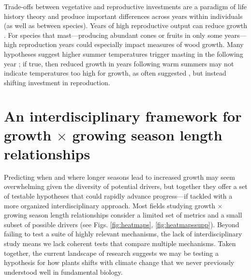\documentclass[11pt]{article}
\begin{document}
Trade-offs between vegetative and reproductive investments are a paradigm of life history theory and produce important differences across years within individuals (as well as between species). Years of high reproductive output can reduce growth \citep{thomas2011bookchptr,hacket2016tree}. For species that mast---producing abundant cones or fruits in only some years---high reproduction years could especially impact measures of wood growth. Many hypotheses suggest higher summer temperatures trigger masting in the following year \citep{hacket2016tree,hacket2016consistent}; if true, then reduced growth in years following warm summers may not indicate temperatures too high for growth, as often suggested \citep[e.g.,][]{gantois2022new,dow2022warm}, but instead shifting investment in reproduction.

\section*{An interdisciplinary framework for growth $\times$ growing season length relationships}
 
Predicting when and where longer seasons lead to increased growth may seem overwhelming given the diversity of potential drivers, but together they offer a set of testable hypotheses that could rapidly advance progress---if tackled with a more organized interdisciplinary approach. Most fields studying growth $\times$ growing season length relationships consider a limited set of metrics and a small subset of possible drivers (see Figs. \ref{fig:heatmaps}, \ref{fig:heatmapssupp}). Beyond failing to test a suite of highly relevant mechanisms, the lack of interdisciplinary study means we lack coherent tests that compare multiple mechanisms. Taken together, the current landscape of research suggests we may be testing a hypothesis for how plants shifts with climate change that we never previously understood well in fundamental biology. 
\end{document}
